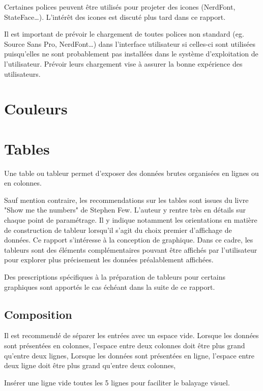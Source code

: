 \documentclass[a4paper,12pt]{article}
\begin{document}
\begin{multicols}{2}
Certaines polices peuvent être utilisés pour projeter des icones (NerdFont, StateFace\ldots{}).\autocite{jonathanschwabishQualitative2021} L'intérêt des icones est discuté plus tard dans ce rapport.

Il est important de prévoir le chargement de toutes polices non standard (eg. Source Sans Pro, NerdFont\ldots{}) dans l'interface utilisateur si celles-ci sont utilisées puisqu'elles ne sont probablement pas installées dans le système d'exploitation de l'utilisateur. Prévoir leurs chargement vise à assurer la bonne expérience des utilisateurs.
\section*{Couleurs}
\label{sec:org2ce6ccd}

\section*{Tables}
\label{sec:org7d8b111}
Une table ou tableur permet d'exposer des données brutes organisées en lignes ou en colonnes. \autocite{mikeyiHowChooseRight2020}

Sauf mention contraire, les recommendations sur les tables sont issues du livre "Show me the numbers" de Stephen Few.\autocite{stephenfewShowMeNumbers2012} L'auteur y rentre très en détails sur chaque point de paramétrage. Il y indique notamment les orientations en matière de construction de tableur lorsqu'il s'agit du choix premier d'affichage de données. Ce rapport s'intéresse à la conception de graphique. Dans ce cadre, les tableurs sont des éléments complémentaires pouvant être affichés par l'utilisateur pour explorer plus précisement les données préalablement affichées.

Des prescriptions spécifiques à la préparation de tableurs pour certains graphiques sont apportés le cas échéant dans la suite de ce rapport.
\subsection*{Composition}
\label{sec:orgcbce21f}
Il est recommendé de séparer les entrées avec un espace vide.
Lorsque les données sont présentées en colonnes, l'espace entre deux colonnes doit être plus grand qu'entre deux lignes,
Lorsque les données sont présentées en ligne, l'espace entre deux ligne doit être plus grand qu'entre deux colonnes,

Insérer une ligne vide toutes les 5 lignes pour faciliter le balayage visuel. \autocite{NFENISO9241-125ErgonomieLinteractionHommesysteme2017}


\end{multicols}
\end{document}
